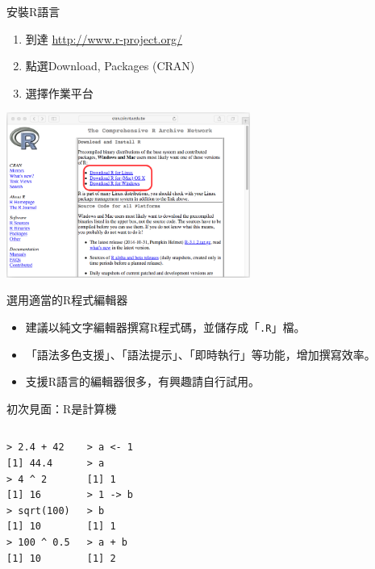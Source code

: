 \documentclass[12pt, aspectratio=43]{beamer}
\let\oldfootnote\footnote
\renewcommand\footnote[1]{\hspace{-0.3em}\oldfootnote{\ignorespaces#1}\hspace{0.3em}}
\begin{document}
\begin{frame}[fragile]{安裝R語言}
\begin{enumerate}
\item 到達 \url{http://www.r-project.org/}
\item 點選Download, Packages (CRAN) \\
\item 選擇作業平台
\end{enumerate}
	\begin{center}\includegraphics[width=0.6\textwidth]{downloadR.png}\end{center}
\end{frame}

\begin{frame}[fragile]{選用適當的R程式編輯器}
\begin{itemize}
\item 建議以純文字編輯器撰寫R程式碼，並儲存成「\verb+.R+」檔。
\item 「語法多色支援」、「語法提示」、「即時執行」等功能，增加撰寫效率。
\item 支援R語言的編輯器很多，有興趣請自行試用。
\end{itemize}
\end{frame}


\begin{frame}[fragile]{初次見面：R是計算機}
\begin{columns}
\begin{verbatim}
> 2.4 + 42
[1] 44.4
> 4 ^ 2
[1] 16
> sqrt(100)
[1] 10
> 100 ^ 0.5
[1] 10
\end{verbatim}

\begin{verbatim}
> a <- 1
> a
[1] 1
> 1 -> b
> b
[1] 1
> a + b
[1] 2
\end{verbatim}

\end{columns}
\end{frame}
\end{document}
